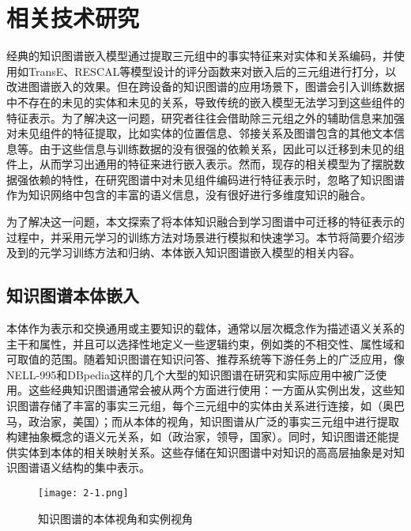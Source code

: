 \chapter{相关技术研究}
经典的知识图谱嵌入模型通过提取三元组中的事实特征来对实体和关系编码，并使用如TransE、RESCAL等模型设计的评分函数来对嵌入后的三元组进行打分，以改进图谱嵌入的效果。但在跨设备的知识图谱的应用场景下，图谱会引入训练数据中不存在的未见的实体和未见的关系，导致传统的嵌入模型无法学习到这些组件的特征表示。为了解决这一问题，研究者往往会借助除三元组之外的辅助信息来加强对未见组件的特征提取，比如实体的位置信息、邻接关系及图谱包含的其他文本信息等。由于这些信息与训练数据的没有很强的依赖关系，因此可以迁移到未见的组件上，从而学习出通用的特征来进行嵌入表示。然而，现存的相关模型为了摆脱数据强依赖的特性，在研究图谱中对未见组件编码进行特征表示时，忽略了知识图谱作为知识网络中包含的丰富的语义信息，没有很好进行多维度知识的融合。


为了解决这一问题，本文探索了将本体知识融合到学习图谱中可迁移的特征表示的过程中，并采用元学习的训练方法对场景进行模拟和快速学习。本节将简要介绍涉及到的元学习训练方法和归纳、本体嵌入知识图谱嵌入模型的相关内容。

\section{知识图谱本体嵌入}
本体作为表示和交换通用或主要知识的载体，通常以层次概念作为描述语义关系的主干和属性，并且可以选择性地定义一些逻辑约束，例如类的不相交性、属性域和可取值的范围。随着知识图谱在知识问答、推荐系统等下游任务上的广泛应用，像NELL-995\cite{xiong2017deeppath}和DBpedia\cite{auer2007dbpedia}这样的几个大型的知识图谱在研究和实际应用中被广泛使用。这些经典知识图谱通常会被从两个方面进行使用：一方面从实例出发，这些知识图谱存储了丰富的事实三元组，每个三元组中的实体由关系进行连接，如（奥巴马，政治家，美国）；而从本体的视角，知识图谱从广泛的事实三元组中进行提取构建抽象概念的语义元关系，如（政治家，领导，国家）。同时，知识图谱还能提供实体到本体的相关映射关系。这些存储在知识图谱中对知识的高高层抽象是对知识图谱语义结构的集中表示。

\begin{figure}
  \centering
  \texttt{[image: 2-1.png]}
  \caption{知识图谱的本体视角和实例视角}
  \label{fig:2-1}
\end{figure}

